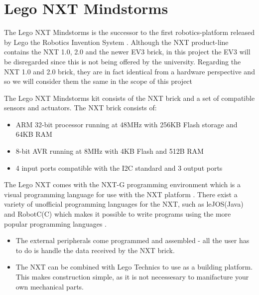 \section{Lego NXT Mindstorms}
The Lego NXT Mindstorms is the successor to the first robotics-platform released
by Lego the Robotics Invention System \citep{NXTHistory}. Although the NXT
product-line contains the NXT 1.0, 2.0 and the newer EV3 brick, in this project
the EV3 will be disregarded since this is not being offered by the university.
Regarding the NXT 1.0 and 2.0 brick, they are in fact identical from a hardware
perspective and so we will consider them the same in the scope of this project
\citep{NXTversions}\nl

The Lego NXT Mindstorms kit consists of the NXT brick and a set of
compatible sensors and actuators. The NXT brick \citep[P.70]{NXTStats} consists
of:

\begin{itemize}
  \item ARM 32-bit processor running at 48MHz with 256KB Flash storage and 64KB RAM
  \item 8-bit AVR running at 8MHz with 4KB Flash and 512B RAM
  \item 4 input ports compatible with the I2C standard and 3 output ports
\end{itemize}

The Lego NXT comes with the NXT-G programming environment which is a visual
programming language for use with the NXT platform \Source. There exist a
variety of unofficial programming languages for the NXT, such as leJOS(Java) and
RobotC(C) which makes it possible to write programs using the more popular programming
languages \citep{NXTProgrammingLanguage}.

\begin{itemize}
  \item The external peripherals come programmed and assembled - all the user
  has to do is handle the data received by the NXT brick.
  \item The NXT can be combined with Lego Technics to use as a building
  platform. This makes construction simple, as it is not necessesary to
  manifacture your own mechanical parts.
\end{itemize}

